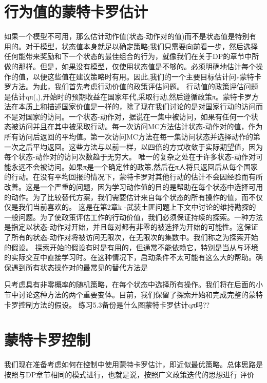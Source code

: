 \section{行为值的蒙特卡罗估计}

如果一个模型不可用，那么估计动作值(状态-动作对的值)而不是状态值是特别有用的。对于模型，状态值本身就足以确定策略;我们只需要向前看一步，然后选择任何能带来奖励和下一个状态的最佳组合的行为，就像我们在关于DP的章节中所做的那样。但是，如果没有模型，仅使用状态值是不够的。必须明确地估计每个操作的值，以便这些值在建议策略时有用。因此,我们的一个主要目标估计问∗蒙特卡罗方法。为此，我们首先考虑行动价值的政策评估问题。
行动值的政策评估问题是估计qπ(,),开始时的预期收益在国家年代,采取行动,然后遵循政策π。蒙特卡罗方法在本质上和描述国家价值是一样的，除了现在我们讨论的是对国家行动的访问而不是对国家的访问。一个状态-动作对，据说在一集中被访问，如果有任何一个状态被访问并且在其中被采取行动。每一次访问MC方法估计状态-动作对的值，作为所有访问后返回的平均值。第一次访问MC方法在每一集访问状态并选择动作的第一次之后平均返回。这些方法与以前一样，以四倍的方式收敛于实际期望值，因为每个状态-动作对的访问次数趋于无穷大。
唯一的复杂之处在于许多状态-动作对可能永远不会被访问。如果π是一个确定性的政策,然后在π人将只返回后从每个国家的行动。在没有平均回报的情况下，蒙特卡罗对其他行动的估计不会因经验而有所改善。这是一个严重的问题，因为学习动作值的目的是帮助在每个状态中选择可用的动作。为了比较替代方案，我们需要估计来自每个状态的所有操作的值，而不仅仅是我们当前喜欢的。
这是在第2章k -武装土匪问题上下文中讨论的维持勘探的一般问题。为了使政策评估工作的行动价值，我们必须保证持续的探索。一种方法是指定以状态-动作对开始，并且每对都有非零的被选择为开始的可能性。这保证了所有的状态-动作对将被访问无限次，在无限次的集数中。我们称之为探索开始的假设。
探索开始的假设有时是有用的，但通常不能依赖它，特别是当从与环境的实际交互中直接学习时。在这种情况下，启动条件不太可能有这么大的帮助。确保遇到所有状态操作对的最常见的替代方法是

只考虑具有非零概率的随机策略，在每个状态中选择所有操作。我们将在后面的小节中讨论这种方法的两个重要变体。目前，我们保留了探索开始和完成完整的蒙特卡罗控制方法的假设。
练习5.3备份是什么图蒙特卡罗估计qπ吗??


\section{蒙特卡罗控制}

我们现在准备考虑如何在控制中使用蒙特卡罗估计，即近似最优策略。总体思路是按照与DP章节相同的模式进行，也就是说，按照广义政策迭代的思想进行
评价

